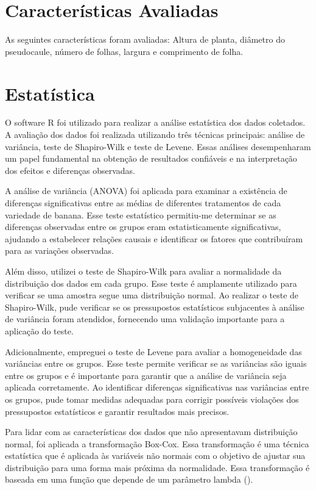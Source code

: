 \section{Características Avaliadas}
As seguintes características foram avaliadas: Altura de planta, diâmetro do pseudocaule, número de folhas, largura e comprimento de folha.

\section{Estatística}
O software R foi utilizado para realizar a análise estatística dos dados coletados. A avaliação dos dados foi realizada utilizando três técnicas principais: análise de variância, teste de Shapiro-Wilk e teste de Levene. Essas análises desempenharam um papel fundamental na obtenção de resultados confiáveis e na interpretação dos efeitos e diferenças observadas.

A análise de variância (ANOVA) foi aplicada para examinar a existência de diferenças significativas entre as médias de diferentes tratamentos de cada variedade de banana. Esse teste estatístico permitiu-me determinar se as diferenças observadas entre os grupos eram estatisticamente significativas, ajudando a estabelecer relações causais e identificar os fatores que contribuíram para as variações observadas.

Além disso, utilizei o teste de Shapiro-Wilk para avaliar a normalidade da distribuição dos dados em cada grupo. Esse teste é amplamente utilizado para verificar se uma amostra segue uma distribuição normal. Ao realizar o teste de Shapiro-Wilk, pude verificar se os pressupostos estatísticos subjacentes à análise de variância foram atendidos, fornecendo uma validação importante para a aplicação do teste.

Adicionalmente, empreguei o teste de Levene para avaliar a homogeneidade das variâncias entre os grupos. Esse teste permite verificar se as variâncias são iguais entre os grupos e é importante para garantir que a análise de variância seja aplicada corretamente. Ao identificar diferenças significativas nas variâncias entre os grupos, pude tomar medidas adequadas para corrigir possíveis violações dos pressupostos estatísticos e garantir resultados mais precisos.

Para lidar com as características dos dados que não apresentavam distribuição normal, foi aplicada a transformação Box-Cox. Essa transformação é uma técnica estatística que é aplicada às variáveis não normais com o objetivo de ajustar sua distribuição para uma forma mais próxima da normalidade. Essa transformação é baseada em uma função que depende de um parâmetro lambda (\λ).